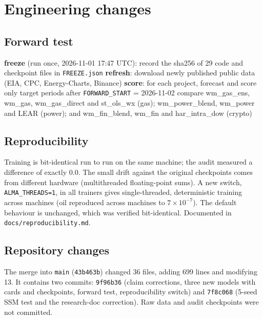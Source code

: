 \documentclass[10pt,a4paper]{article}
\newcommand{\src}[1]{{\footnotesize\texttt{#1}}}
\begin{document}
\section{Engineering changes}
\label{sec:engineering}

\subsection{Forward test}
\begin{algorithm}[H]
\caption{Forward test with a frozen-hash guard (\src{repo/tools/forward/forward\_eval.py})}
\label{alg:fwd}
\textbf{freeze} (run once, 2026-11-01 17:47 UTC): record the sha256 of 29 code and checkpoint files in \src{FREEZE.json}\;
\textbf{refresh}: download newly published public data (EIA, CPC, Energy-Charts, Binance)\;
\textbf{score}: 
for each project, forecast and score only target periods after \texttt{FORWARD\_START} = 2026-11-02\;
compare wm\_gas\_ens, wm\_gas, wm\_gas\_direct and st\_ols\_wx (gas); wm\_power\_blend, wm\_power and LEAR (power); and wm\_fin\_blend, wm\_fin and har\_intra\_dow (crypto)\;
\end{algorithm}

\subsection{Reproducibility}
Training is bit-identical run to run on the same machine; the audit measured a difference of exactly 0.0. The small drift against the original checkpoints comes from different hardware (multithreaded floating-point sums). A new switch, \texttt{ALMA\_THREADS=1}, in all trainers gives single-threaded, deterministic training across machines (oil reproduced across machines to $7\times10^{-7}$). The default behaviour is unchanged, which was verified bit-identical. Documented in \src{docs/reproducibility.md}.

\subsection{Repository changes}
The merge into \texttt{main} (\texttt{43b463b}) changed 36 files, adding 699 lines and modifying 13. It contains two commits: \texttt{9f96b36} (claim corrections, three new models with cards and checkpoints, forward test, reproducibility switch) and \texttt{7f8c068} (5-seed SSM test and the research-doc correction). Raw data and audit checkpoints were not committed.
\end{document}
